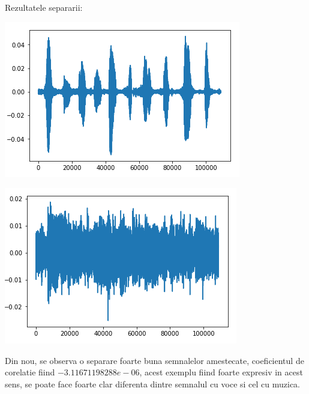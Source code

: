 \documentclass[12pt,oneside]{article}
\begin{document}
 Rezultatele separarii:
\begin{center}
	\includegraphics[scale=1]{music_separated_1}
 \end{center}
\begin{center}
	\includegraphics[scale=1]{music_separated_2}
 \end{center}

 Din nou, se observa o separare foarte buna semnalelor amestecate, coeficientul de corelatie fiind $-3.11671198288e-06$, acest exemplu fiind foarte expresiv in acest sens, se poate face foarte clar diferenta dintre semnalul cu voce si cel cu muzica. 
\end{document}
